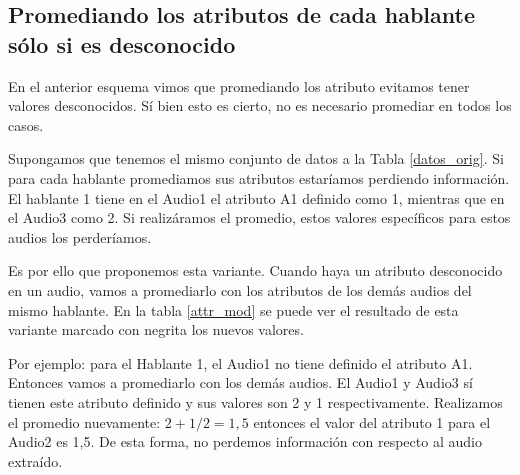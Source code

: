 \subsection{Promediando los atributos de cada hablante sólo si es desconocido}
\label{prom_los_atributos_de_cada_hablante_solo_si_es_desconocido}

En el anterior esquema vimos que promediando los atributo evitamos tener valores desconocidos. Sí bien esto es cierto, no es necesario promediar en todos los casos. 

Supongamos que tenemos el mismo conjunto de datos a la Tabla \ref{datos_orig}. Si para cada hablante promediamos sus atributos estaríamos perdiendo información. El hablante 1 tiene en el Audio1 el atributo A1 definido como 1, mientras que en el Audio3 como 2. Si realizáramos el promedio, estos valores específicos para estos audios los perderíamos.


Es por ello que proponemos esta variante. Cuando haya un atributo desconocido en un audio, vamos a promediarlo con los atributos de los demás audios del mismo hablante. En la tabla \ref{attr_mod} se puede ver el resultado de esta variante marcado con negrita los nuevos valores. 

Por ejemplo: para el Hablante 1, el Audio1 no tiene definido el atributo A1. Entonces vamos a promediarlo con los demás audios. El Audio1 y Audio3 sí tienen este atributo definido y sus valores son 2 y 1 respectivamente. Realizamos el promedio nuevamente: $ 2 + 1 / 2 = 1,5$ entonces el valor del atributo 1 para el Audio2 es 1,5. De esta forma, no perdemos información con respecto al audio extraído.


